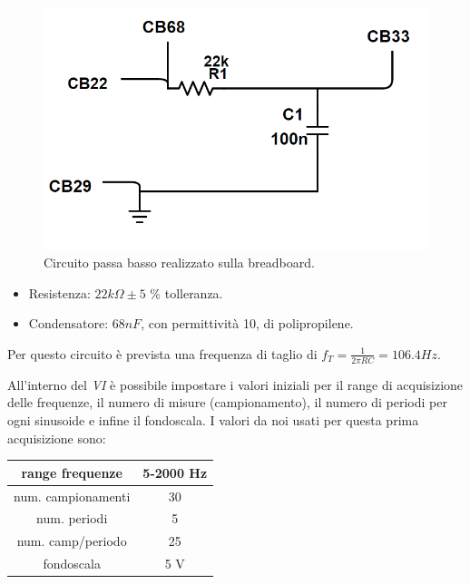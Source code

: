 \documentclass[journal, a4paper]{IEEEtran}
\begin{document}
\begin{figure}
\centering
\includegraphics[width=0.9\linewidth]{./breadboard1_passabasso}
\caption{Circuito passa basso realizzato sulla breadboard.}
\label{fig:breadboard_1}
\end{figure}


\begin{itemize}
\item Resistenza: $22 k\Omega \pm 5 $ \% tolleranza.
\item Condensatore: $68\si{nF}$, con permittività 10, di polipropilene.\\
\end{itemize}


Per questo circuito è prevista una frequenza di taglio di $f_T =\frac{1}{2\pi RC} = 106.4 \si{Hz}$.

All'interno del \textit{VI} è possibile impostare i valori iniziali per il range di acquisizione delle frequenze, il numero di misure (campionamento), il numero di periodi per ogni sinusoide e infine il fondoscala. I valori da noi usati per questa prima acquisizione sono:
\\

\begin{tabular}{|c|c|}
\hline range frequenze & 5-2000 \si{Hz} \\ 
\hline num. campionamenti & 30 \\ 
\hline num. periodi & 5 \\ 
\hline num. camp/periodo & 25 \\ 
\hline fondoscala & 5 \si{V} \\ 
\hline 
\end{tabular} \\
\end{document}
